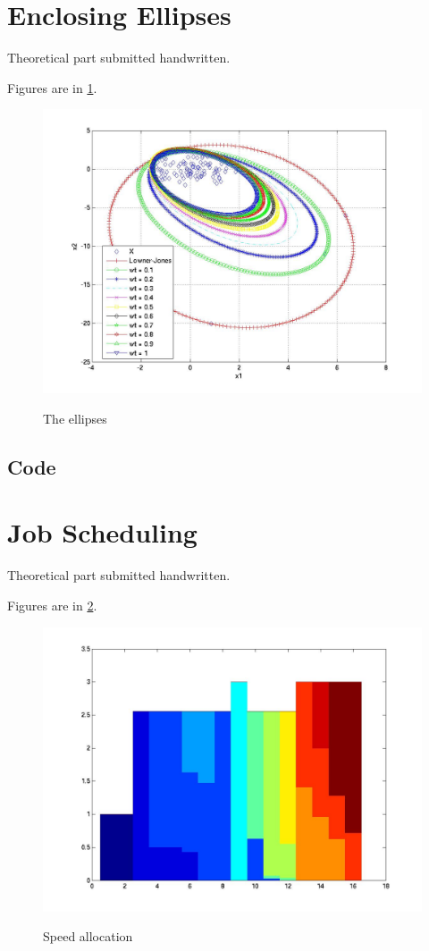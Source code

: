 \documentclass{article}
\begin{document}
\section{Enclosing Ellipses}
Theoretical part submitted handwritten.

Figures are in \ref{fig:results2}.

\begin{figure}[h!]
\includegraphics[scale=0.2]{log/ellipses/ellipses2010-05-10-14:07:46:089.jpg}
\label{fig:results2}
\caption{The ellipses}
\end{figure}

\subsection{Code}



\section{Job Scheduling}
Theoretical part submitted handwritten.

Figures are in \ref{fig:results3}.

\begin{figure}[h!]
\includegraphics[scale=0.2]{log/schedule2010-05-10-16:10:06:392.jpg}
\label{fig:results3}
\caption{Speed allocation}
\end{figure}
\end{document}
